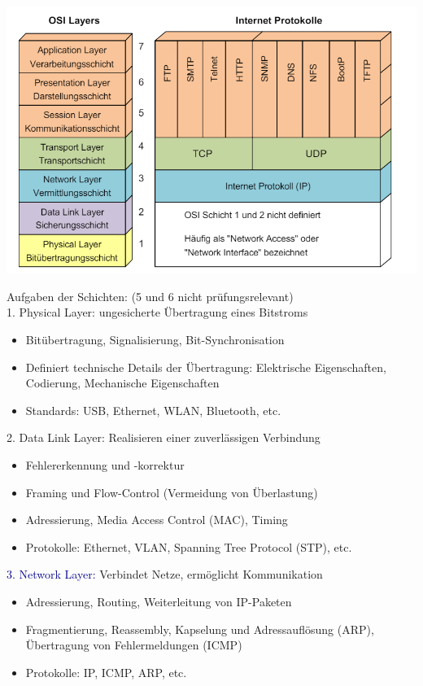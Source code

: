 \centering
\includegraphics[width=0.8\linewidth]{images/OSI_Modell.png}

\begin{KR}{Aufgaben der Schichten:} (5 und 6 nicht prüfungsrelevant)\\
    \textcolor{darkcorn}{1. Physical Layer:} ungesicherte Übertragung eines Bitstroms
    \begin{itemize}
        \item Bitübertragung, Signalisierung, Bit-Synchronisation
        \item Definiert technische Details der Übertragung: 
        Elektrische Eigenschaften, 
        Codierung, 
        Mechanische Eigenschaften
        \item Standards: USB, Ethernet, WLAN, Bluetooth, etc.
    \end{itemize}
    \textcolor{darkpurple}{2. Data Link Layer:} Realisieren einer zuverlässigen Verbindung
    \begin{itemize}
        \item Fehlererkennung und -korrektur
        \item Framing und Flow-Control (Vermeidung von Überlastung) 
        \item Adressierung, Media Access Control (MAC), Timing
        \item Protokolle: Ethernet, VLAN, Spanning Tree Protocol (STP), etc.
    \end{itemize}
    \textcolor{darkblue}{3. Network Layer:} Verbindet Netze, ermöglicht Kommunikation
    \begin{itemize}
        \item Adressierung, Routing, Weiterleitung von IP-Paketen
        \item Fragmentierung, Reassembly, Kapselung und Adressauflösung (ARP), Übertragung von Fehlermeldungen (ICMP)
        \item Protokolle: IP, ICMP, ARP, etc.

\end{itemize}
\end{KR}
